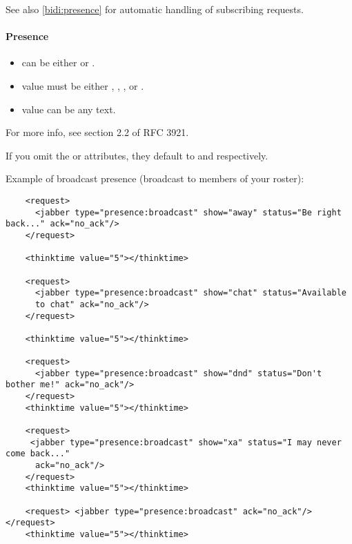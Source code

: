 \documentclass{TSUNG-en}
\begin{document}
See also \ref{bidi:presence} for automatic handling of  subscribing requests.

\paragraph{Presence}
\begin{itemize}
\item {} can be either  or .
\item {} value must be either , , , or .
\item {} value can be any text.
\end{itemize}
For more info, see section 2.2 of RFC 3921.

If you omit the  or  attributes, they default to  and  respectively.

Example of broadcast presence (broadcast to members of your roster):
\begin{Verbatim}
    <request>
      <jabber type="presence:broadcast" show="away" status="Be right back..." ack="no_ack"/>
    </request>

    <thinktime value="5"></thinktime>

    <request>
      <jabber type="presence:broadcast" show="chat" status="Available
      to chat" ack="no_ack"/>
    </request>

    <thinktime value="5"></thinktime>

    <request>
      <jabber type="presence:broadcast" show="dnd" status="Don't bother me!" ack="no_ack"/>
    </request>
    <thinktime value="5"></thinktime>

    <request>
     <jabber type="presence:broadcast" show="xa" status="I may never come back..."
      ack="no_ack"/>
    </request>
    <thinktime value="5"></thinktime>

    <request> <jabber type="presence:broadcast" ack="no_ack"/> </request>
    <thinktime value="5"></thinktime>
\end{Verbatim}
\end{document}
